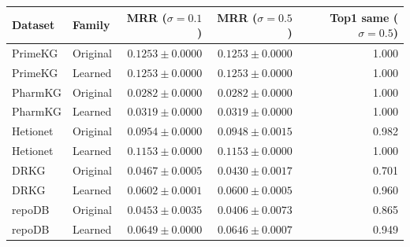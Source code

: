 \begin{tabular}{llrrr}
\toprule
Dataset & Family & MRR ($\sigma=0.1$) & MRR ($\sigma=0.5$) & Top1 same ($\sigma=0.5$) \\
\midrule
PrimeKG & Original & $0.1253\pm0.0000$ & $0.1253\pm0.0000$ & 1.000 \\
PrimeKG & Learned & $0.1253\pm0.0000$ & $0.1253\pm0.0000$ & 1.000 \\
PharmKG & Original & $0.0282\pm0.0000$ & $0.0282\pm0.0000$ & 1.000 \\
PharmKG & Learned & $0.0319\pm0.0000$ & $0.0319\pm0.0000$ & 1.000 \\
Hetionet & Original & $0.0954\pm0.0000$ & $0.0948\pm0.0015$ & 0.982 \\
Hetionet & Learned & $0.1153\pm0.0000$ & $0.1153\pm0.0000$ & 1.000 \\
DRKG & Original & $0.0467\pm0.0005$ & $0.0430\pm0.0017$ & 0.701 \\
DRKG & Learned & $0.0602\pm0.0001$ & $0.0600\pm0.0005$ & 0.960 \\
repoDB & Original & $0.0453\pm0.0035$ & $0.0406\pm0.0073$ & 0.865 \\
repoDB & Learned & $0.0649\pm0.0000$ & $0.0646\pm0.0007$ & 0.949 \\
\bottomrule
\end{tabular}
